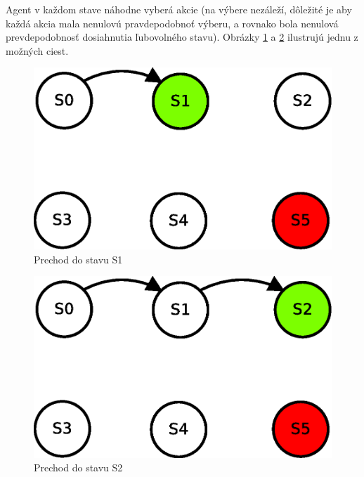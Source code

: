 Agent v každom stave náhodne vyberá akcie (na výbere nezáleží, dôležité je aby
každá akcia mala nenulovú pravdepodobnoť výberu, a rovnako bola nenulová
prevdepodobnosť dosiahnutia ľubovolného stavu). Obrázky \ref{img:q_learning_2}
a \ref{img:q_learning_3} ilustrujú jednu z možných ciest.


\begin{figure}[!htb]
\center
\includegraphics[scale=.6]{../diagrams/q_learning_table_02.eps}
\caption{Prechod do stavu S1}
\label{img:q_learning_2}
\end{figure}

\begin{figure}[!htb]
\center
\includegraphics[scale=.6]{../diagrams/q_learning_table_03.eps}
\caption{Prechod do stavu S2}
\label{img:q_learning_3}
\end{figure}

